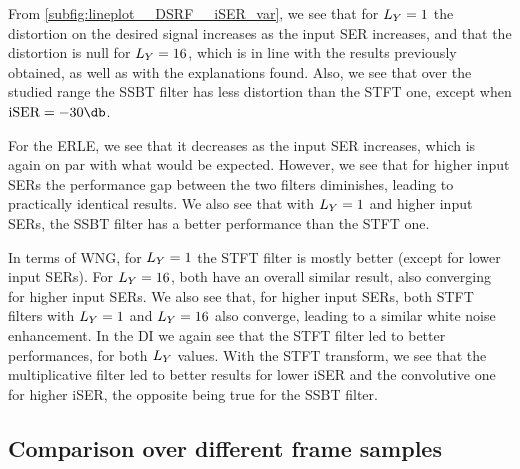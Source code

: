 From \cref{subfig:lineplot__DSRF__iSER_var}, we see that for $\Ly = 1$ the distortion on the desired signal increases as the input SER increases, and that the distortion is null for $\Ly = 16$, which is in line with the results previously obtained, as well as with the explanations found. Also, we see that over the studied range the SSBT filter has less distortion than the STFT one, except when $\iser = -30\dB$.

For the ERLE, we see that it decreases as the input SER increases, which is again on par with what would be expected. However, we see that for higher input SERs the performance gap between the two filters diminishes, leading to practically identical results. We also see that with $\Ly = 1$ and higher input SERs, the SSBT filter has a better performance than the STFT one.

In terms of WNG, for $\Ly = 1$ the STFT filter is mostly better (except for lower input SERs). For $\Ly = 16$, both have an overall similar result, also converging for higher input SERs. We also see that, for higher input SERs, both STFT filters with $\Ly = 1$ and $\Ly = 16$ also converge, leading to a similar white noise enhancement. In the DI we again see that the STFT filter led to better performances, for both $\Ly$ values. With the STFT transform, we see that the multiplicative filter led to better results for lower iSER and the convolutive one for higher iSER, the opposite being true for the SSBT filter.


\subsection{Comparison over different frame samples}
\label{subsec:sec4:comparison_different_Ly}

